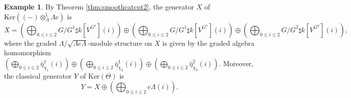 \documentclass[11pt,reqno]{amsart}
\theoremstyle{definition}
\newtheorem{example}[theorem]{Example}
\begin{document}
\begin{example}
By Theorem \ref{thm:smoothcatcpt2}, the generator $X$ of $\mathrm{Ker}( (-) 
\otimes_{\Lambda}^{\mathbb{L}} \Lambda e )$ is 
$$
X = ( \bigoplus_{0 \leq i \leq 2} 
G/G^1 \sharp k[V^{G^1}](i) ) \oplus
( \bigoplus_{0 \leq i \leq 2} G/G^1 \sharp k[V^{G^1}](i) ) \oplus  
( \bigoplus_{0 \leq i \leq 2} G/G^2 \sharp k[V^{G^2}](i) ),
$$
where the graded $\Lambda/ \sqrt{\Lambda e \Lambda}$-module structure 
on $X$ is given by the graded algebra homomorphism 
$( \bigoplus_{0 \leq i \leq 2} 
\bar{\eta}_{\chi_1}^1(i) ) 
\oplus ( \bigoplus_{0 \leq i \leq 
2}\bar{\eta}_{\chi_2}^1(i) ) 
\oplus  ( \bigoplus_{0 \leq i \leq 
2} \bar{\eta}_{\chi_3}^2(i) )$. 
Moreover, the classical generator $Y$ of $\mathrm{Ker}(\Theta)$ is
$$
Y = X \oplus 
(\bigoplus_{0 \leq i \leq 2}  e \Lambda (i)).
$$
\end{example}
\end{document}
